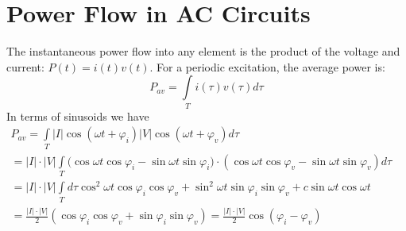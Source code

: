 \section{Power Flow in AC Circuits}
 The instantaneous power flow into any element is the product of the voltage and current: $P(t) = i(t)v(t)$.  For a periodic excitation, the average power is:
    \begin{equation} 
        {P_{av}} = \int\limits_T {i(\tau )v(\tau )d\tau } 
    \end{equation}
In terms of sinusoids we have
    { \small
    $\begin{array}{l}
        {P_{av}} = \int\limits_T {\left| I \right|\cos (\omega t + {\varphi _i})\left| V \right|\cos (\omega t + {\varphi _v})d\tau } \\
         = \left| I \right| \cdot \left| V \right|\int\limits_T {(\cos \omega t\cos {\varphi _i} - \sin \omega t\sin {\varphi _i}} ) \cdot (\cos \omega t\cos {\varphi _v} - \sin \omega t\sin {\varphi _v})d\tau \\
         = \left| I \right| \cdot \left| V \right|\int\limits_T {d\tau {{\cos }^2}\omega t\cos {\varphi _i}\cos {\varphi _v} + {{\sin }^2}\omega t\sin {\varphi _i}\sin {\varphi _v} + c\sin \omega t\cos \omega t} \\
         = \frac{{\left| I \right| \cdot \left| V \right|}}{2}(\cos {\varphi _i}\cos {\varphi _v} + \sin {\varphi _i}\sin {\varphi _v}) = \frac{{\left| I \right| \cdot \left| V \right|}}{2}\cos ({\varphi _i} - {\varphi _v})
    \end{array}$
    }
